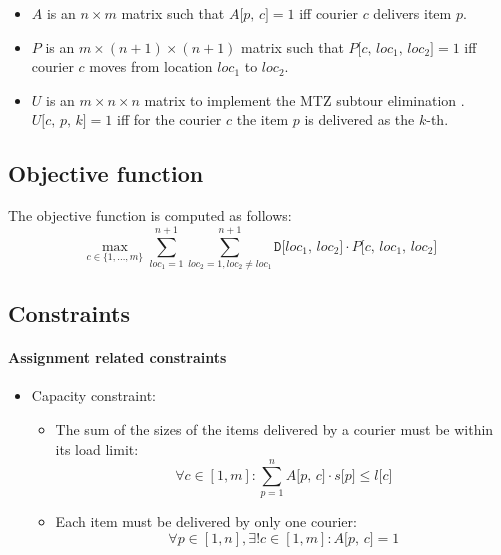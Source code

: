 \begin{itemize}
    \item $A$ is an $n \times m$ matrix such that $A\texttt{[$p$, $c$]} = 1$ iff courier $c$ delivers item $p$.

    \item $P$ is an $m \times (n+1) \times (n+1)$ matrix such that $P\texttt{[$c$, $loc_1$, $loc_2$]} = 1$ iff courier $c$ moves from location $loc_1$ to $loc_2$.

    \item $U$ is an $m \times n \times n$ matrix to implement the MTZ subtour elimination \cite{mtz_subtour}. $U\texttt{[$c$, $p$, $k$]} = 1$ iff for the courier $c$ the item $p$ is delivered as the $k$-th.
\end{itemize}

\subsection{Objective function}

The objective function is computed as follows:
\begin{equation}
    \label{eq:obj_fun}
    \max_{c \in \{ 1, \dots, m \}}
    \sum_{loc_1=1}^{n+1} \sum_{loc_2=1, loc_2 \neq loc_1}^{n+1} \texttt{D[$loc_1$, $loc_2$]} \cdot P\texttt{[$c$, $loc_1$, $loc_2$]}
\end{equation}


\subsection{Constraints}

\paragraph*{Assignment related constraints}

\begin{itemize}
    \item Capacity constraint:
    \begin{itemize}
        \item The sum of the sizes of the items delivered by a courier must be within its load limit:
        \begin{equation}
            \label{eq:capacity1}
            \forall c \in [1, m]:
            \sum_{p=1}^{n} A\texttt{[$p$, $c$]} \cdot s\texttt{[$p$]} \leq \texttt{$l$[$c$]}
        \end{equation}
        \item Each item must be delivered by only one courier:
        \begin{equation}
            \label{eq:capacity2}
            \forall p \in [1, n], \exists! c \in [1, m]: A\texttt{[$p$, $c$]} = 1
        \end{equation}
    \end{itemize}
\end{itemize}

